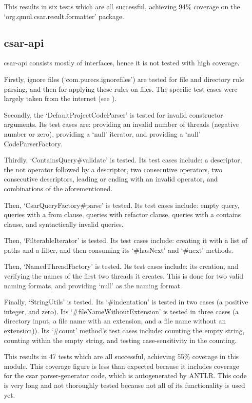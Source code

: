 \documentclass[12pt, letterpaper]{article}
\begin{document}
This results in six tests which are all successful, achieving 94\% coverage on the `org.qmul.csar.result.formatter' package.

\subsection{csar-api}
csar-api consists mostly of interfaces, hence it is not tested with high coverage.

Firstly, ignore files (`com.purecs.ignorefiles') are tested for file and directory rule parsing, and then for applying these rules on files.
The specific test cases were largely taken from the internet (see \autocite{CodeReferences}).

Secondly, the `DefaultProjectCodeParser' is tested for invalid constructor arguments.
Its test cases are: providing an invalid number of threads (negative number or zero), providing a `null' iterator, and providing a `null' CodeParserFactory.

Thirdly, `ContainsQuery\#validate' is tested.
Its test cases include: a descriptor, the not operator followed by a descriptor, two consecutive operators, two consecutive descriptors, leading or ending with an invalid operator, and combinations of the aforementioned.

Then, `CsarQueryFactory\#parse' is tested.
Its test cases include: empty query, queries with a from clause, queries with refactor clause, queries with a contains clause, and syntactically invalid queries.

Then, `FilterableIterator' is tested.
Its test cases include: creating it with a list of paths and a filter, and then consuming its `\#hasNext' and `\#next' methods.

Then, `NamedThreadFactory' is tested.
Its test cases include: its creation, and verifying the names of the first two threads it creates.
This is done for two valid naming formats, and providing `null' as the naming format.

Finally, `StringUtils' is tested.
Its `\#indentation' is tested in two cases (a positive integer, and zero).
Its `\#fileNameWithoutExtension' is tested in three cases (a directory input, a file name with an extension, and a file name without an extension)).
Its `\#count' method's test cases include: counting the empty string, counting within the empty string, and testing case-sensitivity in the counting.

This results in 47 tests which are all successful, achieving 55\% coverage in this module.
This coverage figure is less than expected because it includes coverage for the csar parser-generator code, which is autogenerated by ANTLR.
This code is very long and not thoroughly tested because not all of its functionality is used yet.
\end{document}
